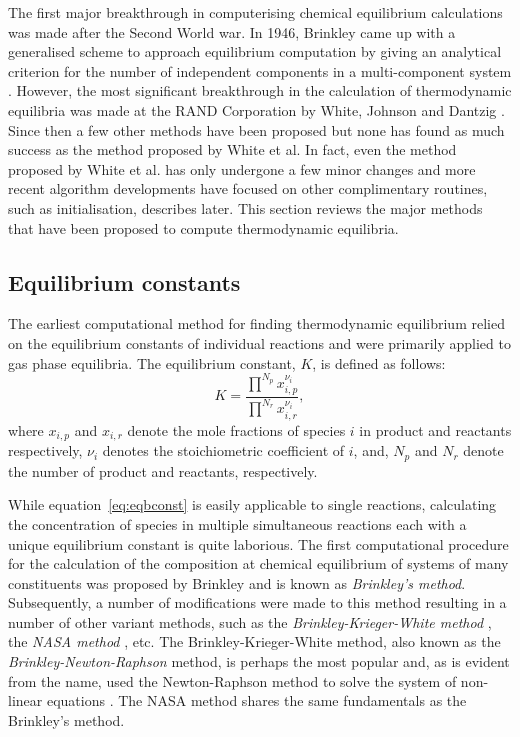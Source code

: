 	The first major breakthrough in computerising chemical equilibrium calculations was made after the Second World war. In 1946, Brinkley came up with a generalised scheme to approach equilibrium computation by giving an analytical criterion for the number of independent components in a multi-component system \cite{vanZeggeren11}. However, the most significant breakthrough in the calculation of thermodynamic equilibria was made at the RAND Corporation by White, Johnson and Dantzig  \cite{White:58}. Since then a few other methods have been proposed but none has found as much success as the method proposed by White et al. In fact, even the method proposed by White et al. has only undergone a few minor changes and more recent algorithm developments have focused on other complimentary routines, such as initialisation, describes later. This section reviews the major methods that have been proposed to compute thermodynamic equilibria.

	\subsection{Equilibrium constants}
	The earliest computational method for finding thermodynamic equilibrium relied on the equilibrium constants of individual reactions and were primarily applied to gas phase equilibria. The equilibrium constant, $K$, is defined as follows:
	\begin{equation}\label{eq:eqbconst}
		K = \frac{\prod^{N_p} x_{i,p}^{\nu_i}}{\prod^{N_r} x_{i,r}^{\nu_i}},
	\end{equation}
	where $x_{i,p}$ and $x_{i,r}$ denote the mole fractions of species $i$ in product and reactants respectively, $\nu_i$ denotes the stoichiometric coefficient of $i$, and, $N_p$ and $N_r$ denote the number of product and reactants, respectively.

	While equation~\eqref{eq:eqbconst} is easily applicable to single reactions, calculating the concentration of species in multiple simultaneous reactions each with a unique equilibrium constant is quite laborious. The first computational procedure for the calculation of the composition at chemical equilibrium of systems of many constituents was proposed by Brinkley \cite{Brinkley:1947aa} and is known as \emph{Brinkley's method}. Subsequently, a number of modifications were made to this method resulting in a number of other variant methods, such as the \emph{Brinkley-Krieger-White method} \cite{Krieger:1948aa}, the \emph{NASA method} \cite{Zeleznik:1968aa}, etc. The Brinkley-Krieger-White method, also known as the \emph{Brinkley-Newton-Raphson} method, is perhaps the most popular and, as is evident from the name, used the Newton-Raphson method to solve the system of non-linear equations \cite{vanZeggeren11}. The NASA method \cite{Zeleznik:1968aa} shares the same fundamentals as the Brinkley's method.

